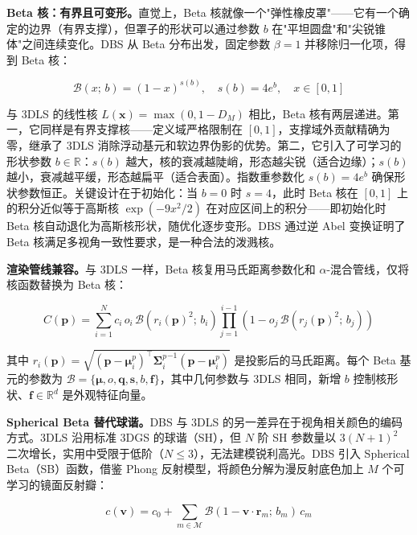 \textbf{Beta 核：有界且可变形。}直觉上，Beta 核就像一个"弹性橡皮罩"——它有一个确定的边界（有界支撑），但罩子的形状可以通过参数 $b$ 在"平坦圆盘"和"尖锐锥体"之间连续变化。DBS 从 Beta 分布出发，固定参数 $\beta=1$ 并移除归一化项，得到 Beta 核：

\begin{equation}
\mathcal{B}(x;\, b) = (1 - x)^{s(b)}, \quad s(b) = 4e^b, \quad x \in [0, 1]
\end{equation}

与 3DLS 的线性核 $L(\mathbf{x}) = \max(0, 1 - D_M)$ 相比，Beta 核有两层递进。第一，它同样是有界支撑核——定义域严格限制在 $[0,1]$，支撑域外贡献精确为零，继承了 3DLS 消除浮动基元和软边界伪影的优势。第二，它引入了可学习的形状参数 $b \in \mathbb{R}$：$s(b)$ 越大，核的衰减越陡峭，形态越尖锐（适合边缘）；$s(b)$ 越小，衰减越平缓，形态越扁平（适合表面）。指数重参数化 $s(b) = 4e^b$ 确保形状参数恒正。关键设计在于初始化：当 $b=0$ 时 $s=4$，此时 Beta 核在 $[0,1]$ 上的积分近似等于高斯核 $\exp(-9x^2/2)$ 在对应区间上的积分——即初始化时 Beta 核自动退化为高斯核形状，随优化逐步变形。DBS 通过逆 Abel 变换证明了 Beta 核满足多视角一致性要求，是一种合法的泼溅核。

\textbf{渲染管线兼容。}与 3DLS 一样，Beta 核复用马氏距离参数化和 $\alpha$-混合管线，仅将核函数替换为 Beta 核：

\begin{equation}
C(\mathbf{p}) = \sum_{i=1}^{N} c_i \, o_i \, \mathcal{B}(r_i(\mathbf{p})^2;\, b_i) \prod_{j=1}^{i-1}\left(1 - o_j \, \mathcal{B}(r_j(\mathbf{p})^2;\, b_j)\right)
\end{equation}

其中 $r_i(\mathbf{p}) = \sqrt{(\mathbf{p} - \boldsymbol{\mu}_i^p)^\top {\boldsymbol{\Sigma}_i^p}^{-1} (\mathbf{p} - \boldsymbol{\mu}_i^p)}$ 是投影后的马氏距离。每个 Beta 基元的参数为 $\mathcal{B} = \{\boldsymbol{\mu}, o, \mathbf{q}, \mathbf{s}, b, \mathbf{f}\}$，其中几何参数与 3DLS 相同，新增 $b$ 控制核形状、$\mathbf{f} \in \mathbb{R}^d$ 是外观特征向量。

\textbf{Spherical Beta 替代球谐。}DBS 与 3DLS 的另一差异在于视角相关颜色的编码方式。3DLS 沿用标准 3DGS 的球谐（SH），但 $N$ 阶 SH 参数量以 $3(N+1)^2$ 二次增长，实用中受限于低阶（$N \leq 3$），无法建模锐利高光。DBS 引入 Spherical Beta（SB）函数，借鉴 Phong 反射模型，将颜色分解为漫反射底色加上 $M$ 个可学习的镜面反射瓣：

\begin{equation}
c(\mathbf{v}) = c_0 + \sum_{m \in \mathcal{M}} \mathcal{B}(1 - \mathbf{v} \cdot \mathbf{r}_m;\, b_m) \, c_m
\end{equation}

